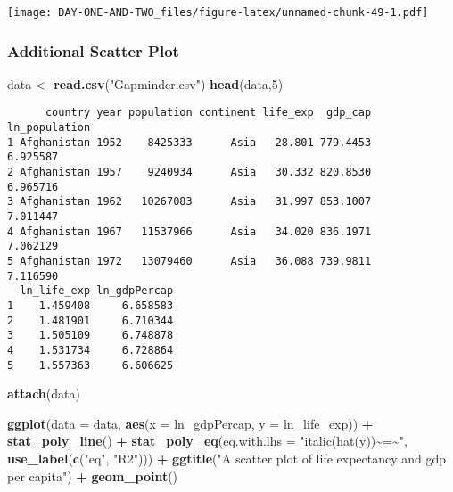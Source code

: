 \documentclass[
]{article}
\newenvironment{Shaded}{\begin{snugshade}}{\end{snugshade}}
\newcommand{\AttributeTok}[1]{\textcolor[rgb]{0.13,0.29,0.53}{#1}}
\newcommand{\DecValTok}[1]{\textcolor[rgb]{0.00,0.00,0.81}{#1}}
\newcommand{\FunctionTok}[1]{\textcolor[rgb]{0.13,0.29,0.53}{\textbf{#1}}}
\newcommand{\NormalTok}[1]{#1}
\newcommand{\OtherTok}[1]{\textcolor[rgb]{0.56,0.35,0.01}{#1}}
\newcommand{\SpecialCharTok}[1]{\textcolor[rgb]{0.81,0.36,0.00}{\textbf{#1}}}
\newcommand{\StringTok}[1]{\textcolor[rgb]{0.31,0.60,0.02}{#1}}
\begin{document}
\texttt{[image: DAY-ONE-AND-TWO\_files/figure-latex/unnamed-chunk-49-1.pdf]}

\hypertarget{additional-scatter-plot}{%
\subsubsection{Additional Scatter Plot}\label{additional-scatter-plot}}

\begin{Shaded}
\begin{Highlighting}[]
\NormalTok{data }\OtherTok{\textless{}{-}} \FunctionTok{read.csv}\NormalTok{(}\StringTok{"Gapminder.csv"}\NormalTok{)}
\FunctionTok{head}\NormalTok{(data,}\DecValTok{5}\NormalTok{)}
\end{Highlighting}
\end{Shaded}

\begin{verbatim}
      country year population continent life_exp  gdp_cap ln_population
1 Afghanistan 1952    8425333      Asia   28.801 779.4453      6.925587
2 Afghanistan 1957    9240934      Asia   30.332 820.8530      6.965716
3 Afghanistan 1962   10267083      Asia   31.997 853.1007      7.011447
4 Afghanistan 1967   11537966      Asia   34.020 836.1971      7.062129
5 Afghanistan 1972   13079460      Asia   36.088 739.9811      7.116590
  ln_life_exp ln_gdpPercap
1    1.459408     6.658583
2    1.481901     6.710344
3    1.505109     6.748878
4    1.531734     6.728864
5    1.557363     6.606625
\end{verbatim}

\begin{Shaded}
\begin{Highlighting}[]
\FunctionTok{attach}\NormalTok{(data)}
\end{Highlighting}
\end{Shaded}

\begin{Shaded}
\begin{Highlighting}[]
\FunctionTok{ggplot}\NormalTok{(}\AttributeTok{data =}\NormalTok{ data, }\FunctionTok{aes}\NormalTok{(}\AttributeTok{x =}\NormalTok{ ln\_gdpPercap, }\AttributeTok{y =}\NormalTok{ ln\_life\_exp)) }\SpecialCharTok{+}
  \FunctionTok{stat\_poly\_line}\NormalTok{() }\SpecialCharTok{+}
  \FunctionTok{stat\_poly\_eq}\NormalTok{(}\AttributeTok{eq.with.lhs =} \StringTok{"italic(hat(y))\textasciitilde{}\textasciigrave{}=\textasciigrave{}\textasciitilde{}"}\NormalTok{,}
               \FunctionTok{use\_label}\NormalTok{(}\FunctionTok{c}\NormalTok{(}\StringTok{"eq"}\NormalTok{, }\StringTok{"R2"}\NormalTok{))) }\SpecialCharTok{+}
  \FunctionTok{ggtitle}\NormalTok{(}\StringTok{"A scatter plot of life expectancy and gdp per capita"}\NormalTok{) }\SpecialCharTok{+}
  \FunctionTok{geom\_point}\NormalTok{()}
\end{Highlighting}
\end{Shaded}
\end{document}
